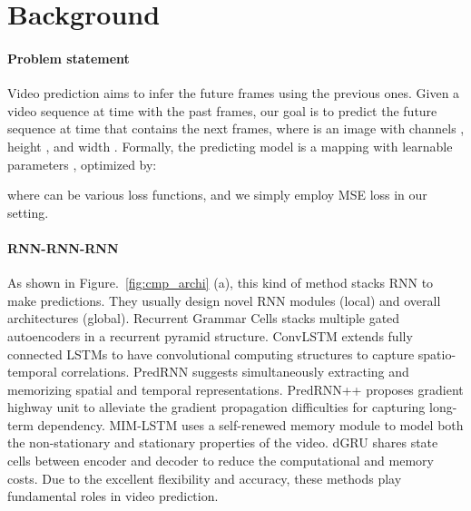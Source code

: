 \documentclass[10pt,twocolumn,letterpaper]{article}
\begin{document}
\section{Background}
\paragraph{Problem statement}
Video prediction aims to infer the future frames using the previous ones. Given a video sequence  at time  with the past  frames, our goal is to predict the future sequence  at time  that contains the next  frames, where  is an image with channels , height , and width . Formally, the predicting model is a mapping  with learnable parameters , optimized by:

where  can be various loss functions, and we simply employ MSE loss in our setting.

\paragraph{RNN-RNN-RNN} As shown in Figure.~\ref{fig:cmp_archi} (a), this kind of method stacks RNN to make predictions. They usually design novel RNN modules (local) and overall architectures (global). Recurrent Grammar Cells \cite{michalski2014modeling} stacks multiple gated autoencoders in a recurrent pyramid structure. ConvLSTM \cite{xingjian2015convolutional} extends fully connected LSTMs to have convolutional computing structures to capture spatio-temporal correlations. PredRNN \cite{wang2017predrnn} suggests simultaneously extracting and memorizing spatial and temporal representations. PredRNN++ \cite{wang2018predrnn++} proposes gradient highway unit to alleviate the gradient propagation difficulties for capturing long-term dependency. MIM-LSTM \cite{wang2019memory} uses a self-renewed memory module to model both the non-stationary and stationary properties of the video. dGRU \cite{oliu2018folded} shares state cells between encoder and decoder to reduce the computational and memory costs. Due to the excellent flexibility and accuracy, these methods play fundamental roles in video prediction.
\end{document}
